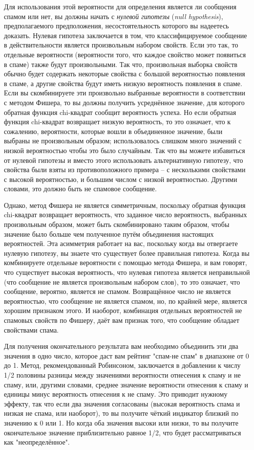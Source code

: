 Для использования этой вероятности для определения является ли сообщения спамом или нет,
вы должны начать с \textit{нулевой гипотезы} (\textit{null hypothesis}), предполагаемого
предположения, несостоятельность которого вы надеетесь доказать. Нулевая гипотеза
заключается в том, что классифицируемое сообщение в действительности является произвольным
набором свойств.  Если это так, то отдельные вероятности (вероятности того, что каждое
свойство может появиться в спаме) также будут произвольными.  Так что, произвольная
выборка свойств обычно будет содержать некоторые свойства с большой вероятностью появления
в спаме, а другие свойства будут иметь низкую вероятность появления в спаме.  Если вы
скомбинируете эти произвольно выбранные вероятности в соответствии с методом Фишера, то вы
должны получить усреднённое значение, для которого обратная функция chi-квадрат сообщит
вероятность успеха.  Но если обратная функция chi-квадрат возвращает низкую вероятность,
то это означает, что к сожалению, вероятности, которые вошли в объединенное значение, были
выбраны не произвольным образом; использовалось слишком много значений с низкой
вероятностью чтобы это было случайным. Так что вы можете избавиться от нулевой гипотезы и
вместо этого использовать альтернативную гипотезу, что свойства были взяты из
противоположного примера -- с несколькими свойствами с высокой вероятностью, и большим
числом с низкой вероятностью.  Другими словами, это должно быть не спамовое сообщение.

Однако, метод Фишера не является симметричным, поскольку обратная функция chi-квадрат
возвращает вероятность, что заданное число вероятность, выбранных произвольным образом,
может быть скомбинировано таким образом, чтобы значение было больше чем полученное путём
объединения настоящих вероятностей.  Эта асимметрия работает на вас, поскольку когда вы
отвергаете нулевую гипотезу, вы знаете что существует более правильная гипотеза.  Когда вы
комбинируете отдельные вероятности с помощью метода Фишера, и вам говорят, что существует
высокая вероятность, что нулевая гипотеза является неправильной (что сообщение не является
произвольным набором слов), то это означает, что сообщение, вероятно, является не спамом.
Возвращённое число не является вероятностью, что сообщение не является спамом, но, по
крайней мере, является хорошим признаком этого.  И наоборот, комбинация отдельных
вероятностей не спамовых свойств по Фишеру, даёт вам признак того, что сообщение обладает
свойствами спама.

Для получения окончательного результата вам необходимо объединить эти два значения в одно
число, которое даст вам рейтинг "спам-не спам" в диапазоне от 0 до 1.  Метод,
рекомендованный Робинсоном, заключается в добавлении к числу 1/2 половины разницы между
значениями вероятности отнесения к спаму и не спаму, или, другими словами, среднее
значение вероятности отнесения к спаму и единицы минус вероятность отнесения к не спаму.
Это приводит нужному эффекту, так что если два значения согласованы (высокая вероятность
спама и низкая не спама, или наоборот), то вы получите чёткий индикатор близкий по
значению к 0 или 1.  Но когда оба значения высоки или низки, то вы получите окончательное
значение приблизительно равное 1/2, что будет рассматриваться как "неопределённое".


